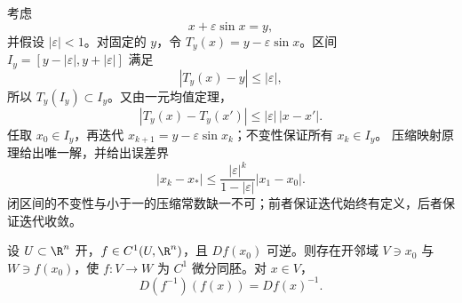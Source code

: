 \begin{example}[可算的非线性反演]\label{ex:2-4-1-4}
考虑
\[
 x+\varepsilon\sin x=y,
 \]
并假设 $|\varepsilon|<1$。对固定的 $y$，令
$T_y(x)=y-\varepsilon\sin x$。区间
$I_y=[y-|\varepsilon|,y+|\varepsilon|]$ 满足
\[
 |T_y(x)-y|\le|\varepsilon|,
\]
所以 $T_y(I_y)\subset I_y$。又由一元均值定理，
\[
 |T_y(x)-T_y(x')|\le|\varepsilon|\,|x-x'|.
\]
任取 $x_0\in I_y$，再迭代 $x_{k+1}=y-\varepsilon\sin x_k$；不变性保证所有 $x_k\in I_y$。
压缩映射原理给出唯一解，并给出误差界
\[
 |x_k-x_*|\le\frac{|\varepsilon|^k}{1-|\varepsilon|}|x_1-x_0|.
\]
闭区间的不变性与小于一的压缩常数缺一不可；前者保证迭代始终有定义，后者保证迭代收敛。
\end{example}

\begin{theorem}[逆函数定理]\label{theorem:2-4-1-3}
设 $U\subset\R^n$ 开，$f\in C^1(U,\R^n)$，且 $Df(x_0)$ 可逆。则存在开邻域
$V\ni x_0$ 与 $W\ni f(x_0)$，使 $f:V\to W$ 为 $C^1$ 微分同胚。对 $x\in V$，
\[
 D(f^{-1})(f(x))=Df(x)^{-1}.
 \tag{2.4.3}\label{eq:inverse-derivative}
\]
\end{theorem}

